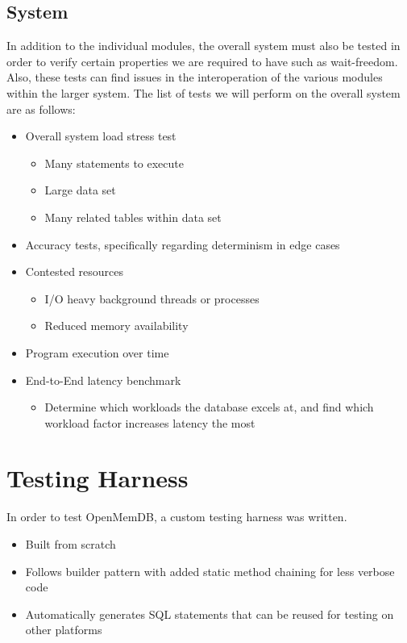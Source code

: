 \documentclass[letterpaper, 11pt]{article}
\begin{document}
\subsection{System}
In addition to the individual modules, the overall system must also be tested in order to verify certain
properties we are required to have such as wait-freedom. Also, these tests can find issues in the interoperation
of the various modules within the larger system. The list of tests we will perform on the overall system are
as follows:
\begin{itemize}
 \item Overall system load stress test
 \begin{itemize}
  \item Many statements to execute
  \item Large data set
  \item Many related tables within data set
 \end{itemize}
 \item Accuracy tests, specifically regarding determinism in edge cases
 \item Contested resources
 \begin{itemize}
  \item I/O heavy background threads or processes
  \item Reduced memory availability
 \end{itemize}
 \item Program execution over time
 \item End-to-End latency benchmark
 \begin{itemize}
  \item Determine which workloads the database excels at, and find which workload factor increases latency
	the most
 \end{itemize}
\end{itemize}

\section{Testing Harness}

In order to test OpenMemDB, a custom testing harness was written.

\begin{itemize}
	\item Built from scratch
	\item Follows builder pattern with added static method chaining for less verbose code
	\item Automatically generates SQL statements that can be reused for testing on other platforms
\end{itemize}
\end{document}
